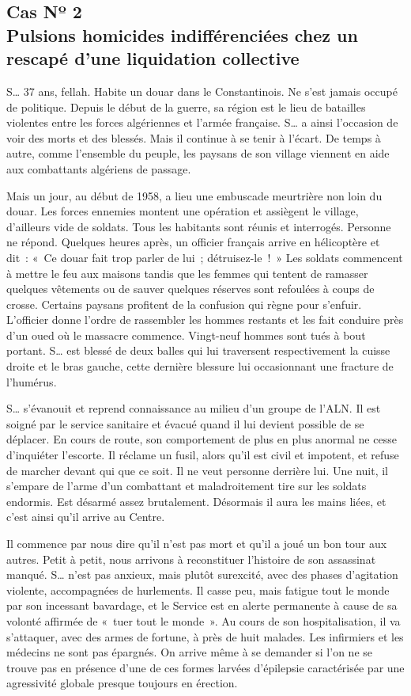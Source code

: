 \documentclass[french,twoside]{book} %
\begin{document}
\subsection[{Cas Nº 2. Pulsions homicides indifférenciées chez un rescapé d’une liquidation collective}]{Cas Nº 2 \\
 Pulsions homicides indifférenciées chez un rescapé d’une liquidation collective}
\noindent S… 37 ans, fellah. Habite un douar dans le Constantinois. Ne s’est jamais occupé de politique. Depuis le début de la guerre, sa région est le lieu de batailles violentes entre les forces algériennes et l’armée française. S… a ainsi l’occasion de voir des morts et des blessés. Mais il continue à se tenir à l’écart. De temps à autre, comme l’ensemble du peuple, les paysans de son village viennent en aide aux combattants algériens de passage.\par
 Mais un jour, au début de 1958, a lieu une embuscade meurtrière non loin du douar. Les forces ennemies montent une opération et assiègent le village, d’ailleurs vide de soldats. Tous les habitants sont réunis et interrogés. Personne ne répond. Quelques heures après, un officier français arrive en hélicoptère et dit : « Ce douar fait trop parler de lui ; détruisez-le ! » Les soldats commencent à mettre le feu aux maisons tandis que les femmes qui tentent de ramasser quelques vêtements ou de sauver quelques réserves sont refoulées à coups de crosse. Certains paysans profitent de la confusion qui règne pour s’enfuir. L’officier donne l’ordre de rassembler les hommes restants et les fait conduire près d’un oued où le massacre commence. Vingt-neuf hommes sont tués à bout portant. S… est blessé de deux balles qui lui traversent respectivement la cuisse droite et le bras gauche, cette dernière blessure lui occasionnant une fracture de l’humérus.\par
S… s’évanouit et reprend connaissance au milieu d’un groupe de l’ALN. Il est soigné par le service sanitaire et évacué quand il lui devient possible de se déplacer. En cours de route, son comportement de plus en plus anormal ne cesse d’inquiéter l’escorte. Il réclame un fusil, alors qu’il est civil et impotent, et refuse de marcher devant qui que ce soit. Il ne veut personne derrière lui. Une nuit, il s’empare de l’arme d’un combattant et maladroitement tire sur les soldats endormis. Est désarmé assez brutalement. Désormais il aura les mains liées, et c’est ainsi qu’il arrive au Centre.\par
Il commence par nous dire qu’il n’est pas mort et qu’il a joué un bon tour aux autres. Petit à petit, nous arrivons à reconstituer l’histoire de son assassinat manqué. S… n’est pas anxieux, mais plutôt surexcité, avec des phases d’agitation violente, accompagnées de hurlements. Il casse peu, mais fatigue tout le monde par son incessant bavardage, et le Service est en alerte permanente à cause de sa volonté affirmée de « tuer tout le monde ». Au cours de son hospitalisation, il va s’attaquer, avec des armes de fortune, à près de huit malades. Les infirmiers et les médecins ne sont pas épargnés. On arrive même à se demander si l’on   ne se trouve pas en présence d’une de ces formes larvées d’épilepsie caractérisée par une agressivité globale presque toujours en érection.\par
\end{document}
